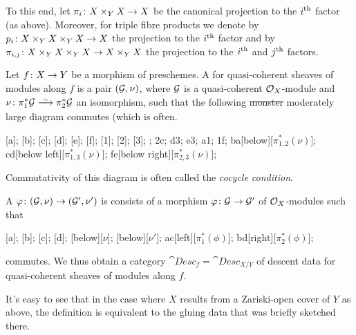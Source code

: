 \documentclass[a4paper,parskip=half,numbers=enddot, DIV=12]{scrreprt}
\begin{document}
 To this end, let $\pi_i\colon X\times_YX\morphism X$ be the canonical projection to the $i^{\text{th}}$ factor (as above). Moreover, for triple fibre products we denote by $p_i\colon X\times_YX\times_YX\morphism X$ the projection to the $i^{\text{th}}$ factor and by $\pi_{i,j}\colon X\times_YX\times_YX\morphism X\times_YX$ the projection to the $i^{\text{th}}$ and $j^{\text{th}}$ factors.
\begin{defi}
	Let $f\colon X\morphism Y$ be a morphism of preschemes. A  for quasi-coherent sheaves of modules along $f$ is a pair $(\mathcal{G},\nu)$, where $\mathcal{G}$ is a quasi-coherent $\mathcal{O}_X$-module and $\nu\colon \pi_1^*\Gg\isomorphism\pi_2^*\Gg$ an isomorphism, such that the following \sout{monster} moderately large diagram commutes (which is often.
	\begin{diagram*}
		[a];
		[b];
		[c];
		[d];
		[e];
		[f];
		[1];
		[2];
		[3];
		\scriptsize
		;
		\isoarrow2c;
		\isoarrow d3;
		\isoarrow e3;
		\isoarrow a1;
		\isoarrow 1f;
		\isoarrow ba[below][$\pi_{1,2}^*(\nu)$];
		\isoarrow cd[below left][$\pi_{1,3}^*(\nu)$];
		\isoarrow fe[below right][$\pi_{2,3}^*(\nu)$];
	\end{diagram*}
	Commutativity of this diagram is often called the \emph{cocycle condition}.
	
	A  $\phi\colon (\Gg,\nu)\morphism(\Gg',\nu')$ is consists of a morphism $\phi\colon \Gg\morphism\Gg'$ of $\mathcal{O}_X$-modules such that
	\begin{diagram*}
		\object{0,1.5}{$\pi_1^*\Gg$}[a];
		\object{2.5,1.5}{$\pi_2^*\Gg$}[b];
		\object{0,0}{$\pi_1^*\Gg'$}[c];
		\object{2.5,0}{$\pi_2^*\Gg'$}[d];
		\scriptsize
		[below][$\nu$];
		[below][$\nu'$];
		\arrow ac[left][$\pi_1^*(\phi)$];
		\arrow bd[right][$\pi_2^*(\phi)$];
	\end{diagram*}
	commutes. We thus obtain a category $\cat{Desc}_f=\cat{Desc}_{X/Y}$ of descent data for quasi-coherent sheaves of modules along $f$.
\end{defi}
\begin{rem}
	It's easy to see that in the case where $X$ results from a Zariski-open cover of $Y$ as above, the definition is equivalent to the gluing data that was briefly sketched there.
\end{rem}
\end{document}
